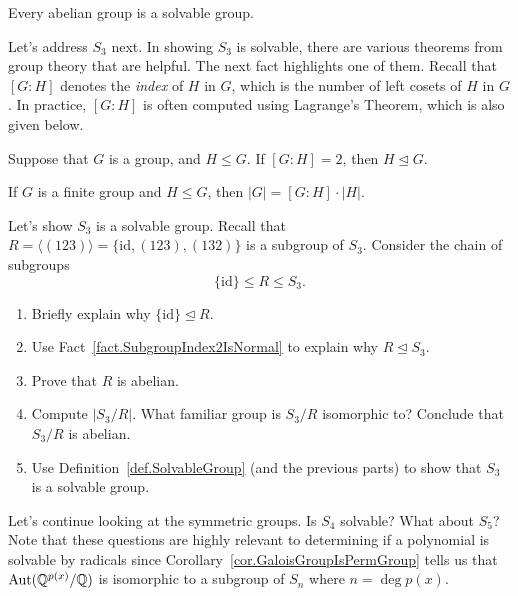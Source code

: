 \begin{theorem}
Every abelian group is a solvable group.
\end{theorem}

Let's address $S_3$ next. In showing $S_3$ is solvable, there are various theorems from group theory that are helpful. The next fact highlights one of them. Recall that $[G:H]$ denotes the \emph{index} of $H$ in $G$, which is the number of left cosets of $H$ in $G$. In practice, $[G:H]$ is often computed using Lagrange's Theorem, which is also given below. 

\begin{fact}\label{fact.SubgroupIndex2IsNormal}
Suppose that $G$ is a group, and $H\le G$. If $[G:H]=2$, then  $H\trianglelefteq G$.
\end{fact}

\begin{fact}\label{thm.Lagrange}
If $G$ is a finite group and $H\le G$, then $|G| = [G:H]\cdot|H|$.
\end{fact}

\begin{problem}
Let's show $S_3$ is a solvable group. Recall that $R = \langle (123)\rangle = \{\text{id},(123),(132)\}$ is a subgroup of $S_3$. Consider the chain of subgroups \[\{\text{id}\} \le R \le S_3.\]
\begin{enumerate}
\item Briefly explain why $\{\text{id}\} \trianglelefteq R$.
\item Use Fact~\ref{fact.SubgroupIndex2IsNormal} to explain why $R\trianglelefteq S_3$.
\item Prove that $R$ is abelian.
\item Compute $|S_3/R|$. What familiar group is  $S_3/R$ isomorphic to? Conclude that $S_3/R$ is abelian.
\item Use Definition~\ref{def.SolvableGroup} (and the previous parts) to show that $S_3$ is a solvable group.
\end{enumerate}
\end{problem}

Let's continue looking at the symmetric groups. Is $S_4$ solvable? What about $S_5$? Note that these  questions are highly relevant to determining if a polynomial is solvable by radicals since Corollary~\ref{cor.GaloisGroupIsPermGroup} tells us that $\operatorname{Aut}(\mathbb{Q}^{p(x)}/\mathbb{Q})$ is isomorphic to a subgroup of $S_n$  where $n = \deg p(x)$.

